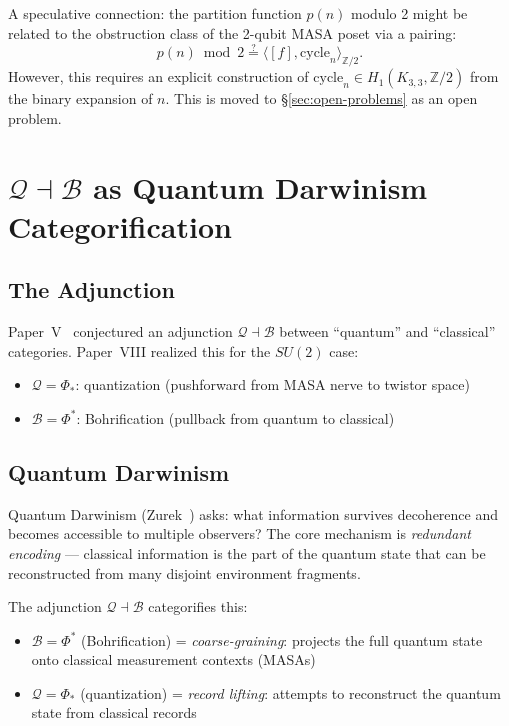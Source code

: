 \documentclass[11pt,a4paper]{article}
\theoremstyle{remark}
\newcommand{\Z}{\mathbb{Z}}
\begin{document}
A speculative connection: the partition function $p(n)$ modulo 2 might
be related to the obstruction class of the 2-qubit MASA poset via a
pairing:
\[
p(n) \bmod 2 \stackrel{?}{=} \langle [f], \text{cycle}_n \rangle_{\Z/2}.
\]
However, this requires an explicit construction of
$\text{cycle}_n \in H_1(K_{3,3}, \Z/2)$ from the binary expansion of
$n$. This is moved to \S\ref{sec:open-problems} as an open problem.

\section{$\mathcal{Q} \dashv \mathcal{B}$ as Quantum Darwinism Categorification}
\label{sec:darwinism}

\subsection{The Adjunction}

Paper~V~\cite{PaperV} conjectured an adjunction $\mathcal{Q} \dashv \mathcal{B}$
between ``quantum'' and ``classical'' categories. Paper~VIII realized
this for the $SU(2)$ case:
\begin{itemize}
  \item $\mathcal{Q} = \Phi_*$: quantization (pushforward from MASA nerve
    to twistor space)
  \item $\mathcal{B} = \Phi^*$: Bohrification (pullback from quantum to
    classical)
\end{itemize}

\subsection{Quantum Darwinism}

Quantum Darwinism (Zurek~\cite{Zurek2009}) asks: what information survives decoherence
and becomes accessible to multiple observers? The core mechanism is
\emph{redundant encoding} --- classical information is the part of the
quantum state that can be reconstructed from many disjoint environment
fragments.

The adjunction $\mathcal{Q} \dashv \mathcal{B}$ categorifies this:
\begin{itemize}
  \item $\mathcal{B} = \Phi^*$ (Bohrification) = \emph{coarse-graining}:
    projects the full quantum state onto classical measurement contexts
    (MASAs)
  \item $\mathcal{Q} = \Phi_*$ (quantization) = \emph{record lifting}:
    attempts to reconstruct the quantum state from classical records
\end{itemize}
\end{document}

